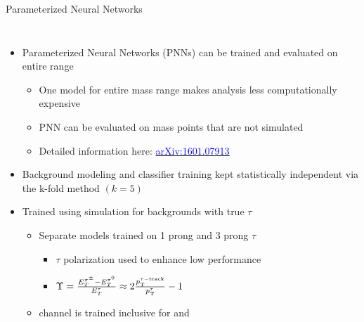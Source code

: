\documentclass[aspectratio=169,xcolor=table]{beamer}
\begin{document}
    \begin{frame}[t]{Parameterized Neural Networks}
      \begin{columns}[t]
      \vspace{-0.5cm}
      \begin{itemize}
      \small
      \item Parameterized Neural Networks (PNNs) can be trained and evaluated on entire \mHpm range
      \begin{itemize}
        \item One model for entire mass range makes analysis less computationally expensive
        \item PNN can be evaluated on mass points that are not simulated
        \item Detailed information here: \href{https://arxiv.org/abs/1601.07913}{\textcolor{blue}{arXiv:1601.07913}}
      \end{itemize}
      \item Background modeling and classifier training kept statistically independent via the k-fold method $(k=5)$
      \item Trained using simulation for backgrounds with true $\tau$
      \begin{itemize}
      \item Separate models trained on 1 prong and 3 prong $\tau$
      \begin{itemize}
        \item $\tau$ polarization used to enhance low \mHpm performance
        \item $\Upsilon = \frac{ E^{\pi^{\pm}}_{T} - E^{\pi^{0}}_{T}}{E^{\tau}_{T}} \approx 2 \frac{p_{\text{T}}^{\tau-\mathrm{track}}}{p_{\text{T}}^{\tau}} -1$
      \end{itemize}
      \item \taulep channel is trained inclusive for \tauel and \taumu
    \end{itemize}

\end{itemize}
\end{columns}
\end{frame}
\end{document}
